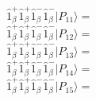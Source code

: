 \documentclass[14pt]{article}
\begin{document}
    $ \hat{1}_{\beta}^{+}\hat{1}_{\beta}^{+}\hat{1}_{\beta}^{-}\hat{1}_{\beta}^{-} \vert{P_{11}}\rangle =  $ \\ 
    $ \hat{1}_{\beta}^{+}\hat{1}_{\beta}^{+}\hat{1}_{\beta}^{-}\hat{1}_{\beta}^{-} \vert{P_{12}}\rangle =  $ \\ 
    $ \hat{1}_{\beta}^{+}\hat{1}_{\beta}^{+}\hat{1}_{\beta}^{-}\hat{1}_{\beta}^{-} \vert{P_{13}}\rangle =  $ \\ 
    $ \hat{1}_{\beta}^{+}\hat{1}_{\beta}^{+}\hat{1}_{\beta}^{-}\hat{1}_{\beta}^{-} \vert{P_{14}}\rangle =  $ \\ 
    $ \hat{1}_{\beta}^{+}\hat{1}_{\beta}^{+}\hat{1}_{\beta}^{-}\hat{1}_{\beta}^{-} \vert{P_{15}}\rangle =  $ \\ 
    
\end{document}
